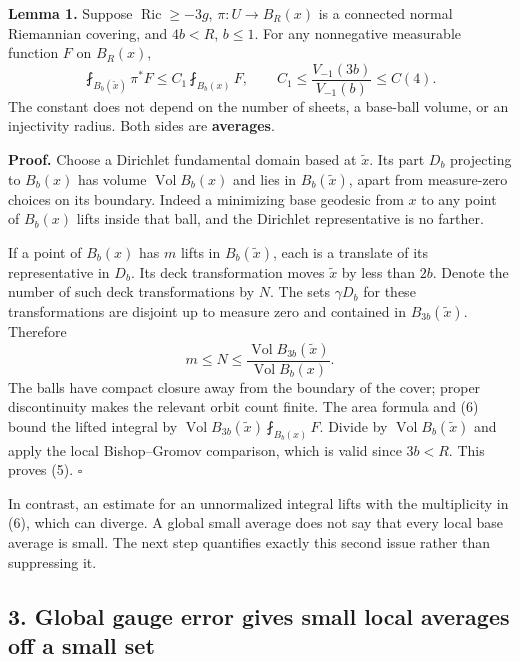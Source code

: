\documentclass[
  11pt,
]{article}
\begin{document}
\textbf{Lemma 1.} Suppose \(\operatorname{Ric}\ge-3g\),
\(\pi:U\to B_R(x)\) is a connected normal Riemannian covering, and
\(4b<R\), \(b\le1\). For any nonnegative measurable function \(F\) on
\(B_R(x)\), \[
 \fint_{B_b(\widetilde x)}\pi^*F
       \le C_1\fint_{B_b(x)}F,
 \qquad C_1\le\frac{V_{-1}(3b)}{V_{-1}(b)}\le C(4).
 \tag{5}
\] The constant does not depend on the number of sheets, a base-ball
volume, or an injectivity radius. Both sides are \textbf{averages}.

\textbf{Proof.} Choose a Dirichlet fundamental domain based at
\(\widetilde x\). Its part \(D_b\) projecting to \(B_b(x)\) has volume
\(\operatorname{Vol}B_b(x)\) and lies in \(B_b(\widetilde x)\), apart
from measure-zero choices on its boundary. Indeed a minimizing base
geodesic from \(x\) to any point of \(B_b(x)\) lifts inside that ball,
and the Dirichlet representative is no farther.

If a point of \(B_b(x)\) has \(m\) lifts in \(B_b(\widetilde x)\), each
is a translate of its representative in \(D_b\). Its deck transformation
moves \(\widetilde x\) by less than \(2b\). Denote the number of such
deck transformations by \(N\). The sets \(\gamma D_b\) for these
transformations are disjoint up to measure zero and contained in
\(B_{3b}(\widetilde x)\). Therefore \[
 m\le N\le
 \frac{\operatorname{Vol}B_{3b}(\widetilde x)}
      {\operatorname{Vol}B_b(x)}.
 \tag{6}
\] The balls have compact closure away from the boundary of the cover;
proper discontinuity makes the relevant orbit count finite. The area
formula and (6) bound the lifted integral by
\(\operatorname{Vol}B_{3b}(\widetilde x)\fint_{B_b(x)}F\). Divide by
\(\operatorname{Vol}B_b(\widetilde x)\) and apply the local
Bishop--Gromov comparison, which is valid since \(3b<R\). This proves
(5). \(\square\)

In contrast, an estimate for an unnormalized integral lifts with the
multiplicity in (6), which can diverge. A global small average does not
say that every local base average is small. The next step quantifies
exactly this second issue rather than suppressing it.

\hypertarget{global-gauge-error-gives-small-local-averages-off-a-small-set}{%
\subsection{3. Global gauge error gives small local averages off a small
set}\label{global-gauge-error-gives-small-local-averages-off-a-small-set}}
\end{document}
